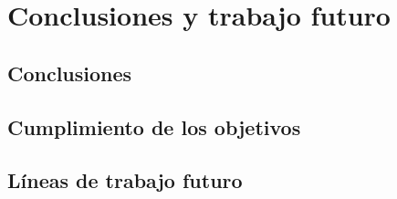 \chapter{Conclusiones y trabajo futuro}

\section{Conclusiones}

\section{Cumplimiento de los objetivos}

\section{Líneas de trabajo futuro}

